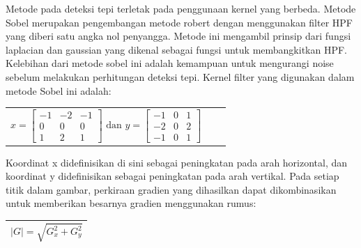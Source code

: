Metode pada deteksi tepi terletak pada penggunaan kernel yang berbeda. Metode Sobel merupakan pengembangan metode robert dengan menggunakan filter HPF yang diberi satu angka nol penyangga. Metode ini mengambil prinsip dari fungsi laplacian dan gaussian yang dikenal sebagai fungsi untuk membangkitkan HPF. Kelebihan dari metode sobel ini adalah kemampuan untuk mengurangi noise sebelum melakukan perhitungan deteksi tepi. Kernel filter yang digunakan dalam metode Sobel ini adalah: 

\begin{center}
	\begin{tabular}{ c c c}
		$
		x = 
		\left[ \begin{array}{rcl}
		-1 & -2 & -1 \\ 
		0 & 0 & 0 \\
		1 & 2 & 1 \end{array} \right]
		\mbox{~dan~}
		y =
		\left[ \begin{array}{rcl}
		-1 & 0 & 1 \\ 
		-2 & 0 & 2 \\
		-1 & 0 & 1 \end{array} \right]
		$
	\end{tabular}
\end{center}



Koordinat x didefinisikan di sini sebagai peningkatan pada arah horizontal, dan koordinat y didefinisikan sebagai peningkatan pada arah vertikal. Pada setiap titik dalam gambar, perkiraan gradien yang dihasilkan dapat dikombinasikan untuk memberikan besarnya gradien menggunakan rumus:

\begin{table}[H]
	\small
	\begin{adjustbox}{width=1\textwidth}
		\begin{tabular}{|p{13.55cm}|}
			\hline
			\begin{equation} \label{eqn:sobel}
			\displaystyle
			|G| = \sqrt{G_{x}^{2}+G_{y}^{2}}
			\end{equation} \\
			\hline
		\end{tabular}
	\end{adjustbox}
\end{table}

